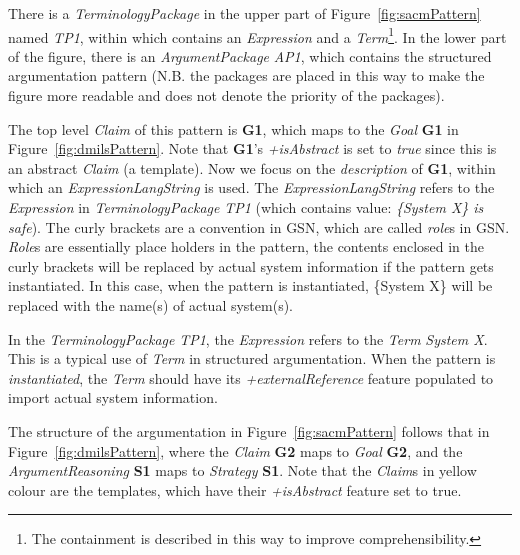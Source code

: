 There is a \textit{TerminologyPackage} in the upper part of Figure~\ref{fig:sacmPattern} named \textit{TP1}, within which contains an \textit{Expression} and a \textit{Term}\footnote{The containment is described in this way to improve comprehensibility.}. 
In the lower part of the figure, there is an \textit{ArgumentPackage} \textit{AP1}, which contains the structured argumentation pattern (N.B. the packages are placed in this way to make the figure more readable and does not denote the priority of the packages).

The top level \textit{Claim} of this pattern is \textbf{G1}, which maps to the \textit{Goal} \textbf{G1} in Figure~\ref{fig:dmilsPattern}. 
Note that \textbf{G1}'s \textit{+isAbstract} is set to \textit{true} since this is an abstract \textit{Claim} (a template). Now we focus on the \textit{description} of \textbf{G1}, within which an \textit{ExpressionLangString} is used. 
The \textit{ExpressionLangString} refers to the \textit{Expression} in \textit{TerminologyPackage} \textit{TP1} (which contains value: \textit{\{System X\} is safe}). 
The curly brackets are a convention in GSN, which are called \textit{role}s in GSN. 
\textit{Role}s are essentially place holders in the pattern, the contents enclosed in the curly brackets will be replaced by actual system information if the pattern gets instantiated. 
In this case, when the pattern is instantiated, \{System X\} will be replaced with the name(s) of actual system(s). 

In the \textit{TerminologyPackage} \textit{TP1}, the \textit{Expression} refers to the \textit{Term} \textit{System X}. 
This is a typical use of \textit{Term} in structured argumentation. 
When the pattern is \textit{instantiated}, the \textit{Term} should have its \textit{+externalReference} feature populated to import actual system information. 

The structure of the argumentation in Figure~\ref{fig:sacmPattern} follows that in Figure~\ref{fig:dmilsPattern}, where the \textit{Claim} \textbf{G2} maps to \textit{Goal} \textbf{G2}, and the \textit{ArgumentReasoning} \textbf{S1} maps to \textit{Strategy} \textbf{S1}. 
Note that the \textit{Claim}s in yellow colour are the templates, which have their \textit{+isAbstract} feature set to true. 

